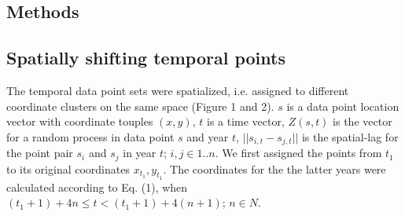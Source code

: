 \documentclass[a0,portrait]{a0poster}
\begin{document}
\begin{multicols}{2}
\color{DarkSlateGray} %




\section*{Methods}

\subsection*{Spatially shifting temporal points}

The temporal data point sets were spatialized, i.e. assigned to different coordinate clusters on the same space (Figure 1 and 2). $s$ is a data point location vector with coordinate touples $(x,y)$, $t$ is a time vector, $Z(s,t)$ is the vector for a random process in data point $s$ and year $t$, $||s_{i,t}-s_{j,t}||$ is the spatial-lag for the point pair $s_i$ and $s_j$ in year $t$; $i,j \in 1..n$. We first assigned the points from $t_1$ to its original coordinates $x_{t_1},y_{t_1}$. The coordinates for the the latter years were calculated according to Eq. (1), when $(t_1+1)+4n \leq t<(t_1+1)+4(n+1)$; $n \in N$.


\end{multicols}
\end{document}
